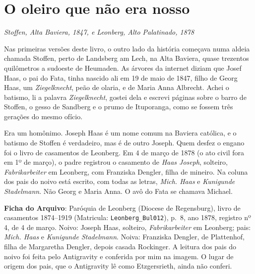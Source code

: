 \documentclass[
  brazilian,
  11pt,
  openany]{book}
\begin{document}
\section{O oleiro que não era
nosso}\label{o-oleiro-que-nuxe3o-era-nosso}

\emph{Stoffen, Alta Baviera, 1847, e Leonberg, Alto Palatinado, 1878}

Nas primeiras versões deste livro, o outro lado da história começava
numa aldeia chamada Stoffen, perto de Landsberg am Lech, na Alta
Baviera, quase trezentos quilômetros a sudoeste de Heumaden. As árvores
da internet diziam que Josef Haas, o pai do Fata, tinha nascido ali em
19 de maio de 1847, filho de Georg Haas, um \emph{Ziegelknecht}, peão de
olaria, e de Maria Anna Albrecht. Achei o batismo, li a palavra
\emph{Ziegelknecht}, gostei dela e escrevi páginas sobre o barro de
Stoffen, o gesso de Sandberg e o prumo de Ituporanga, como se fossem
três gerações do mesmo ofício.

Era um homônimo. Joseph Haas é um nome comum na Baviera católica, e o
batismo de Stoffen é verdadeiro, mas é de outro Joseph. Quem desfez o
engano foi o livro de casamentos de Leonberg. Em 4 de março de 1878 (o
ato civil fora em 1º de março), o padre registrou o casamento de
\emph{Haas Joseph}, solteiro, \emph{Fabrikarbeiter} em Leonberg, com
Franziska Dengler, filha de mineiro. Na coluna dos pais do noivo está
escrito, com todas as letras, \emph{Mich. Haas} e \emph{Kunigunde
Stadelmann}. Não Georg e Maria Anna. O avô do Fata se chamava Michael.

\begin{ficha}

\textbf{Ficha do Arquivo}: Paróquia de Leonberg (Diocese de Regensburg),
livro de casamentos 1874--1919 (Matricula: \texttt{Leonberg\_Bul012}),
p.~8, ano 1878, registro nº 4, de 4 de março. Noivo: Joseph Haas,
solteiro, \emph{Fabrikarbeiter} em Leonberg; pais: \emph{Mich. Haas} e
\emph{Kunigunde Stadelmann}. Noiva: Franziska Dengler, de Plattenhof,
filha de Margaretha Dengler, depois casada Rockinger. A leitura dos pais
do noivo foi feita pelo Antigravity e conferida por mim na imagem. O
lugar de origem dos pais, que o Antigravity lê como Etzgersrieth, ainda
não conferi.

\end{ficha}
\end{document}
